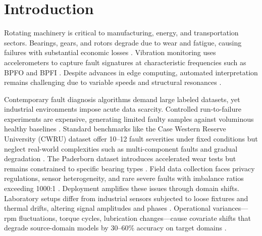 \section{Introduction}

Rotating machinery is critical to manufacturing, energy, and transportation sectors. Bearings, gears, and rotors degrade due to wear and fatigue, causing failures with substantial economic losses \cite{cite1}\cite{cite22}. Vibration monitoring uses accelerometers to capture fault signatures at characteristic frequencies such as BPFO and BPFI \cite{cite2}\cite{cite3}. Despite advances in edge computing, automated interpretation remains challenging due to variable speeds and structural resonances \cite{cite4}.

Contemporary fault diagnosis algorithms demand large labeled datasets, yet industrial environments impose acute data scarcity. Controlled run-to-failure experiments are expensive, generating limited faulty samples against voluminous healthy baselines \cite{cite5}. Standard benchmarks like the Case Western Reserve University (CWRU) dataset offer 10--12 fault severities under fixed conditions but neglect real-world complexities such as multi-component faults and gradual degradation \cite{cite6}. The Paderborn dataset introduces accelerated wear tests but remains constrained to specific bearing types \cite{cite7}. Field data collection faces privacy regulations, sensor heterogeneity, and rare severe faults with imbalance ratios exceeding 1000:1 \cite{cite8}. Deployment amplifies these issues through domain shifts. Laboratory setups differ from industrial sensors subjected to loose fixtures and thermal drifts, altering signal amplitudes and phases \cite{cite25}. Operational variances---rpm fluctuations, torque cycles, lubrication changes---cause covariate shifts that degrade source-domain models by 30--60\% accuracy on target domains \cite{cite9}\cite{cite26}.

